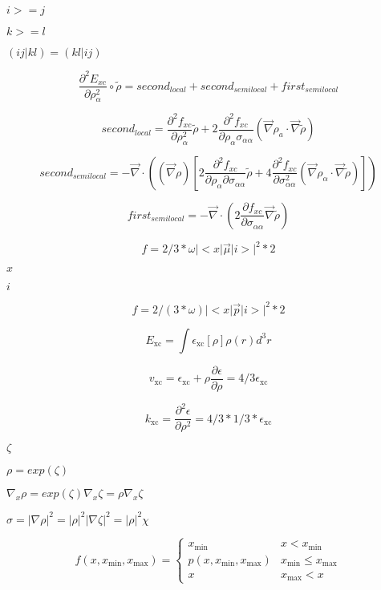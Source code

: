 \documentclass{article}
\begin{document}
$i>=j$
\pagebreak

$k>=l$
\pagebreak

$(ij|kl)=(kl|ij)$
\pagebreak

\[ \frac{\partial^2E_{xc}}{\partial \rho_\alpha^2}\circ\tilde\rho = second_{local} + second_{semilocal} + first_{semilocal} \]
\pagebreak

\[ second_{local} = \frac{\partial^2 f_{xc}}{\partial \rho_\alpha^2}\tilde \rho + 2\frac{\partial^2 f_{xc}}{\partial \rho_\alpha\sigma_{\alpha\alpha}} \left(\vec\nabla \rho_a\cdot \vec \nabla\tilde\rho\right) \]
\pagebreak

\[ second_{semilocal} = -\vec\nabla\cdot\left((\vec\nabla\rho) \left[2\frac{\partial^2 f_{xc}}{\partial\rho_\alpha\partial\sigma_{\alpha\alpha}}\tilde\rho + 4\frac{\partial^2 f_{xc}}{\partial\sigma_{\alpha\alpha}^2} \left(\vec\nabla\rho_\alpha\cdot\vec\nabla\tilde\rho\right)\right]\right) \]
\pagebreak

\[ first_{semilocal} = -\vec\nabla\cdot\left(2\frac{\partial f_{xc}}{\partial\sigma_{\alpha\alpha}}\vec\nabla\tilde\rho\right) \]
\pagebreak

\[ f = 2/3 * \omega |<x | \vec \mu | i >| ^2 * 2 \]
\pagebreak

$ x $
\pagebreak

$ i $
\pagebreak

\[ f = 2/(3 * \omega) |<x | \vec p | i >| ^2 * 2 \]
\pagebreak

\[ E_\mathrm{xc} = \int\epsilon_\mathrm{xc}[\rho]\rho(r) d^3r \]
\pagebreak

\[ v_\mathrm{xc} = \epsilon_\mathrm{xc} + \rho\frac{\partial \epsilon}{\partial \rho} = 4/3\epsilon_\mathrm{xc} \]
\pagebreak

\[ k_\mathrm{xc} = \frac{\partial^2\epsilon}{\partial \rho^2} = 4/3*1/3 * \epsilon_\mathrm{xc} \]
\pagebreak

$ \zeta $
\pagebreak

$ \rho = exp(\zeta) $
\pagebreak

$ \nabla_x\rho = exp(\zeta)\nabla_x\zeta = \rho \nabla_x\zeta $
\pagebreak

$ \sigma = |\nabla\rho|^2 = |\rho|^2 |\nabla\zeta|^2 = |\rho|^2 \chi $
\pagebreak

\[ f(x,x_{\mathrm{min}},x_{\mathrm{max}}) = \left\{ \begin{array}{ll} x_{\mathrm{min}} & x < x_{\mathrm{min}} \\ p(x,x_{\mathrm{min}},x_{\mathrm{max}}) & x_{\mathrm{min}} \leq x_{\mathrm{max}} \\ x & x_{\mathrm{max}} < x \end{array} \right. \]
\pagebreak
\end{document}
